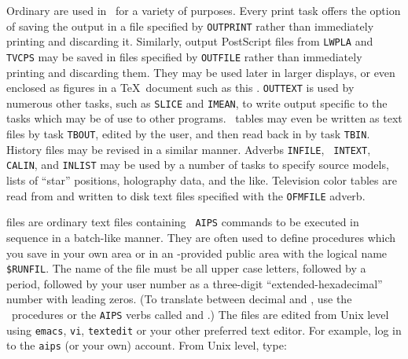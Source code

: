      Ordinary  are used in \AIPS\ for a variety of
purposes. Every print task offers the option of saving the output in a
file specified by {\tt OUTPRINT} rather than immediately printing and
discarding it.  Similarly, output PostScript files from {\tt LWPLA} and
{\tt TVCPS} may be saved in files specified by {\tt OUTFILE} rather
than immediately printing and discarding them.  They may be used later
in larger displays, or even enclosed as figures in a \TeX\ document
such as this \hbox{\Cookbook}.  {\tt OUTTEXT} is used by numerous
other tasks, such as {\tt SLICE} and {\tt IMEAN}, to write output
specific to the tasks which may be of use to other programs.  \AIPS\
tables may even be written as text files by task {\tt TBOUT}, edited
by the user, and then read back in by task \hbox{{\tt TBIN}}.  History
files may be revised in a similar manner.  Adverbs {\tt INFILE}, {\tt
INTEXT}, {\tt CALIN}, and {\tt INLIST} may be used by a number of
tasks to specify source models, lists of ``star'' positions,
holography data, and the like.  Television color tables are read from
and written to disk text files specified with the {\tt OFMFILE}
adverb.


     {\tt {}} files are ordinary text files containing {\tt
AIPS} commands to be executed in sequence in a batch-like manner.
They are often used to define procedures which you save in your own
area or in an \AIPS-provided public area with the logical name
\hbox{{\tt \$RUNFIL}}.  The name of the file must be all upper case
letters, followed by a period, followed by your user number as a
three-digit ``extended-hexadecimal'' number with leading zeros.  (To
translate between decimal and \indx{extended hexadecimal}, use the
\AIPS\ procedures or the {\tt AIPS} verbs called {\tt \indx{EHEX}} and
\hbox{{\tt \tndx{REHEX}}}.)  The files are edited from Unix level
using {\tt emacs}, {\tt vi}, {\tt textedit} or your other preferred
text editor. For example, log in to the {\tt aips} (or your own)
account.  From Unix level, type:
\btd
{}
\dispx{{\tt \%}\qs emacs \qs MAPIT.03D \CR}{ }
\etd
{}

